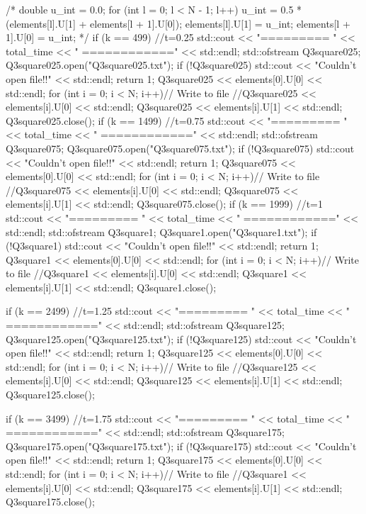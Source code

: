 \documentclass[a4paper, 12pt]{article}
\begin{document}
\begin{spverbatim}
		/*
		double u_int = 0.0;
		for (int l = 0; l < N - 1; l++)
		{
			u_int = 0.5 * (elements[l].U[1] + elements[l + 1].U[0]);
			elements[l].U[1] = u_int;
			elements[l + 1].U[0] = u_int;
		}*/
		if (k == 499) //t=0.25
		{
			std::cout << "=========   " << total_time << "   ============" << std::endl;
			std::ofstream Q3square025;
			Q3square025.open("Q3square025.txt");
			if (!Q3square025)
			{
				std::cout << "Couldn't open file!!" << std::endl;
				return 1;
			}
			Q3square025 << elements[0].U[0] << std::endl;
			for (int i = 0; i < N; i++)// Write to file
			{
				//Q3square025 << elements[i].U[0] << std::endl;
				Q3square025 << elements[i].U[1] << std::endl;
			}
			Q3square025.close();
		}
		if (k == 1499) //t=0.75
		{
			std::cout << "=========   " << total_time << "   ============" << std::endl;
			std::ofstream Q3square075;
			Q3square075.open("Q3square075.txt");
			if (!Q3square075)
			{
				std::cout << "Couldn't open file!!" << std::endl;
				return 1;
			}
			Q3square075 << elements[0].U[0] << std::endl;
			for (int i = 0; i < N; i++)// Write to file
			{
				//Q3square075 << elements[i].U[0] << std::endl;
				Q3square075 << elements[i].U[1] << std::endl;
			}
			Q3square075.close();
		}
		if (k == 1999) //t=1
		{
			std::cout << "=========   " << total_time << "   ============" << std::endl;
			std::ofstream Q3square1;
			Q3square1.open("Q3square1.txt");
			if (!Q3square1)
			{
				std::cout << "Couldn't open file!!" << std::endl;
				return 1;
			}
			Q3square1 << elements[0].U[0] << std::endl;
			for (int i = 0; i < N; i++)// Write to file
			{
				//Q3square1 << elements[i].U[0] << std::endl;
				Q3square1 << elements[i].U[1] << std::endl;
			}
			Q3square1.close();
		}

		if (k == 2499) //t=1.25
		{
			std::cout << "=========   " << total_time << "   ============" << std::endl;
			std::ofstream Q3square125;
			Q3square125.open("Q3square125.txt");
			if (!Q3square125)
			{
				std::cout << "Couldn't open file!!" << std::endl;
				return 1;
			}
			Q3square125 << elements[0].U[0] << std::endl;
			for (int i = 0; i < N; i++)// Write to file
			{
				//Q3square125 << elements[i].U[0] << std::endl;
				Q3square125 << elements[i].U[1] << std::endl;
			}
			Q3square125.close();
		}

		if (k == 3499) //t=1.75
		{
			std::cout << "=========   " << total_time << "   ============" << std::endl;
			std::ofstream Q3square175;
			Q3square175.open("Q3square175.txt");
			if (!Q3square175)
			{
				std::cout << "Couldn't open file!!" << std::endl;
				return 1;
			}
			Q3square175 << elements[0].U[0] << std::endl;
			for (int i = 0; i < N; i++)// Write to file
			{
				//Q3square1 << elements[i].U[0] << std::endl;
				Q3square175 << elements[i].U[1] << std::endl;
			}
			Q3square175.close();
		}


\end{spverbatim}
\end{document}
